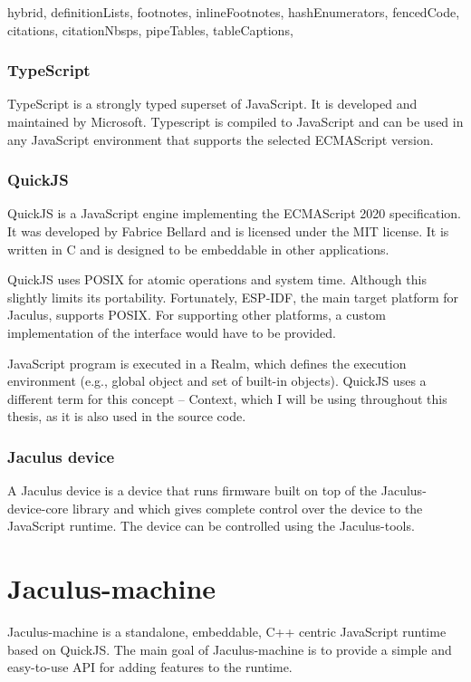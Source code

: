 \documentclass[
  digital,
  oneside,
  nosansbold,
  nocolorbold,
  lof,
  lot
]{fithesis4}
\begin{document}
\begin{markdown*}{%
  hybrid,
  definitionLists,
  footnotes,
  inlineFootnotes,
  hashEnumerators,
  fencedCode,
  citations,
  citationNbsps,
  pipeTables,
  tableCaptions,
}
\subsection{TypeScript}

TypeScript is a strongly typed superset of JavaScript. It is developed and maintained by Microsoft. Typescript is compiled to JavaScript and can be used in any JavaScript environment that supports the selected ECMAScript version.


\subsection{QuickJS}

QuickJS is a JavaScript engine implementing the ECMAScript 2020 specification. It was developed by Fabrice Bellard and is licensed under the MIT license. It is written in C and is designed to be embeddable in other applications.

QuickJS uses POSIX for atomic operations and system time. Although this slightly limits its portability. Fortunately, ESP-IDF, the main target platform for Jaculus, supports POSIX. For supporting other platforms, a custom implementation of the interface would have to be provided.

JavaScript program is executed in a Realm, which defines the execution environment (e.g., global object and set of built-in objects). QuickJS uses a different term for this concept -- Context, which I will be using throughout this thesis, as it is also used in the source code.


\subsection{Jaculus device}

A Jaculus device is a device that runs firmware built on top of the Jaculus-device-core library and which gives complete control over the device to the JavaScript runtime. The device can be controlled using the Jaculus-tools.


\chapter{Jaculus-machine}

Jaculus-machine is a standalone, embeddable, C++ centric JavaScript runtime based on QuickJS. The main goal of Jaculus-machine is to provide a simple and easy-to-use API for adding features to the runtime.


\end{markdown*}
\end{document}
